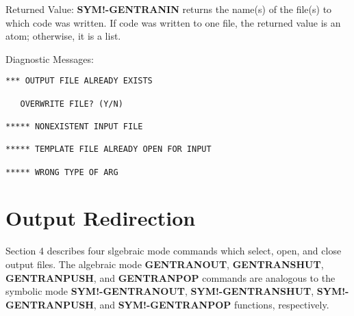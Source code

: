 \begin{describe}{Returned Value:}
{\bf SYM!-GENTRANIN} returns the name(s) of the file(s) to which code was
written.  If code was written to one file, the returned value is an atom;
otherwise, it is a list.
\end{describe} 
\begin{describe}{Diagnostic Messages:}
\begin{verbatim}
*** OUTPUT FILE ALREADY EXISTS

   OVERWRITE FILE? (Y/N)

***** NONEXISTENT INPUT FILE

***** TEMPLATE FILE ALREADY OPEN FOR INPUT

***** WRONG TYPE OF ARG
\end{verbatim}
\end{describe} 

\section{Output Redirection}
Section 4 describes four slgebraic mode commands which select, open, and
close output files.  The algebraic mode {\bf GENTRANOUT}, {\bf GENTRANSHUT},
{\bf GENTRANPUSH}, and {\bf GENTRANPOP} commands are analogous to the
symbolic mode {\bf SYM!-GENTRANOUT}, {\bf SYM!-GENTRANSHUT},
{\bf SYM!-GENTRANPUSH}, and {\bf SYM!-GENTRANPOP} functions, respectively.


